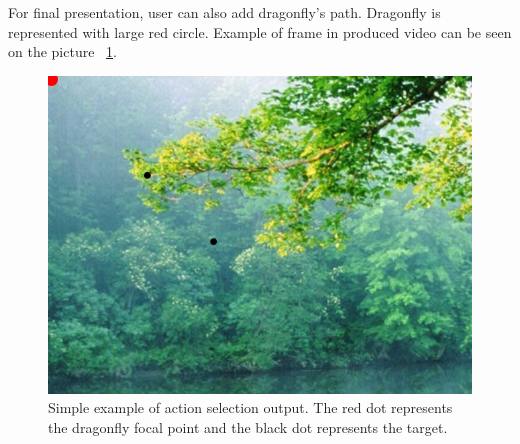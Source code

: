\documentclass[hidelinks,a4paper,11pt]{article}
\begin{document}
For final presentation, user can also add dragonfly's path. Dragonfly is represented with large red circle.
Example of frame in produced video can be seen on the picture  ~\ref{target_animation_example}.

\begin{figure}[hb]
\centering
\includegraphics[scale = 0.3]{example}
\caption{Simple example of action selection output. The red dot represents the dragonfly focal point and the black dot represents the target.}
\label{target_animation_example}
\end{figure}
\end{document}
